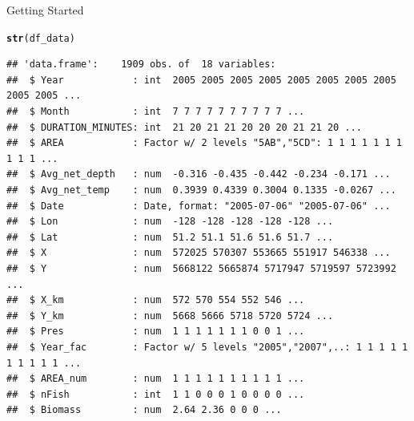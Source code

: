 \documentclass{beamer}\usepackage[]{graphicx}\usepackage[]{color}
\makeatletter
\newcommand{\hlstd}[1]{\textcolor[rgb]{0.345,0.345,0.345}{#1}}%
\newcommand{\hlkwd}[1]{\textcolor[rgb]{0.737,0.353,0.396}{\textbf{#1}}}%
\newenvironment{kframe}{%
 \def\at@end@of@kframe{}%
 \ifinner\ifhmode%
  \def\at@end@of@kframe{\end{minipage}}%
  \begin{minipage}{\columnwidth}%
 \fi\fi%
 \def\FrameCommand##1{\hskip\@totalleftmargin \hskip-\fboxsep
 \colorbox{shadecolor}{##1}\hskip-\fboxsep
     \hskip-\linewidth \hskip-\@totalleftmargin \hskip\columnwidth}%
 \MakeFramed {\advance\hsize-\width
   \@totalleftmargin\z@ \linewidth\hsize
   \@setminipage}}%
 {\par\unskip\endMakeFramed%
 \at@end@of@kframe}
\newenvironment{knitrout}{}{} %
\makeatother
\begin{document}
\begin{frame}[fragile]{Getting Started}
\begin{knitrout}\scriptsize
{}\color{fgcolor}\begin{kframe}
\begin{alltt}
\hlkwd{str}\hlstd{(df_data)}
\end{alltt}
\begin{verbatim}
## 'data.frame':	1909 obs. of  18 variables:
##  $ Year            : int  2005 2005 2005 2005 2005 2005 2005 2005 2005 2005 ...
##  $ Month           : int  7 7 7 7 7 7 7 7 7 7 ...
##  $ DURATION_MINUTES: int  21 20 21 21 20 20 20 21 21 20 ...
##  $ AREA            : Factor w/ 2 levels "5AB","5CD": 1 1 1 1 1 1 1 1 1 1 ...
##  $ Avg_net_depth   : num  -0.316 -0.435 -0.442 -0.234 -0.171 ...
##  $ Avg_net_temp    : num  0.3939 0.4339 0.3004 0.1335 -0.0267 ...
##  $ Date            : Date, format: "2005-07-06" "2005-07-06" ...
##  $ Lon             : num  -128 -128 -128 -128 -128 ...
##  $ Lat             : num  51.2 51.1 51.6 51.6 51.7 ...
##  $ X               : num  572025 570307 553665 551917 546338 ...
##  $ Y               : num  5668122 5665874 5717947 5719597 5723992 ...
##  $ X_km            : num  572 570 554 552 546 ...
##  $ Y_km            : num  5668 5666 5718 5720 5724 ...
##  $ Pres            : num  1 1 1 1 1 1 1 0 0 1 ...
##  $ Year_fac        : Factor w/ 5 levels "2005","2007",..: 1 1 1 1 1 1 1 1 1 1 ...
##  $ AREA_num        : num  1 1 1 1 1 1 1 1 1 1 ...
##  $ nFish           : int  1 1 0 0 0 1 0 0 0 0 ...
##  $ Biomass         : num  2.64 2.36 0 0 0 ...
\end{verbatim}
\end{kframe}
\end{knitrout}
\end{frame}

\end{document}
